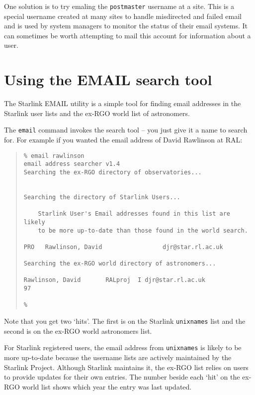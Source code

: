 \documentclass[twoside,11pt]{article}
\newcommand{\xlabel}[1]{}
\renewcommand{\_}{\texttt{\symbol{95}}}
\begin{document}
One solution is to try emaling the \texttt{postmaster} username at a site.
This is a special username created at many sites to handle misdirected and
failed email and is used by system managers to monitor the status of their
email systems.  It can sometimes be worth attempting to mail this account for
information about a user.

\section{\xlabel{using_the_email_search_tool}Using the EMAIL search tool}
\label{using_the_email_search_tool}

The Starlink EMAIL utility is a simple tool for finding email addresses in
the Starlink user lists and the ex-RGO world list of astronomers.

The \texttt{email} command invokes the search tool -- you just give it a
name to search for.  For example if you wanted the email address of
David Rawlinson at RAL:

\begin{quote}
\begin{small}
\begin{verbatim}
% email rawlinson
email address searcher v1.4
Searching the ex-RGO directory of observatories...


Searching the directory of Starlink Users...

    Starlink User's Email addresses found in this list are likely
    to be more up-to-date than those found in the world search.

PRO   Rawlinson, David                 djr@star.rl.ac.uk

Searching the ex-RGO world directory of astronomers...

Rawlinson, David       RALproj  I djr@star.rl.ac.uk                         97

%
\end{verbatim}
\end{small}
\end{quote}

Note that you get two `hits'.  The first is on the Starlink \texttt{unixnames}
list and the second is on the ex-RGO world astronomers list.

For Starlink registered users, the email address from \texttt{unixnames}
is likely to be more up-to-date because the username lists are actively
maintained by the Starlink Project.  Although Starlink maintains it, the
ex-RGO list relies on users to provide updates for their own entries.
The number beside each `hit' on the ex-RGO world list shows which year
the entry was last updated.

\end{document}
